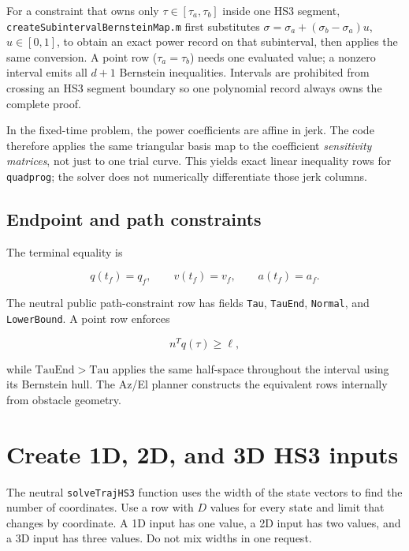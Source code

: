 \documentclass[10pt,letterpaper]{article}
\newcommand{\file}[1]{\nolinkurl{#1}}
\begin{document}
For a constraint that owns only $\tau\in[\tau_a,\tau_b]$ inside one HS3
segment, \file{createSubintervalBernsteinMap.m} first substitutes
$\sigma=\sigma_a+(\sigma_b-\sigma_a)u$, $u\in[0,1]$, to obtain an exact power
record on that subinterval, then applies the same conversion. A point row
($\tau_a=\tau_b$) needs one evaluated value; a nonzero interval emits all
$d+1$ Bernstein inequalities. Intervals are prohibited from crossing an HS3
segment boundary so one polynomial record always owns the complete proof.

In the fixed-time problem, the power coefficients are affine in jerk. The code
therefore applies the same triangular basis map to the coefficient
\emph{sensitivity matrices}, not just to one trial curve. This yields exact
linear inequality rows for \file{quadprog}; the solver does not numerically
differentiate those jerk columns.

\subsection{Endpoint and path constraints}

The terminal equality is

\begin{equation}
q(t_f)=q_f,\qquad v(t_f)=v_f,\qquad a(t_f)=a_f.
\end{equation}

The neutral public path-constraint row has fields
\file{Tau}, \file{TauEnd}, \file{Normal}, and \file{LowerBound}. A point row
enforces

\begin{equation}\label{eq:pathrow}
n^T q(\tau)\ge \ell,
\end{equation}

while $\mathrm{TauEnd}>\mathrm{Tau}$ applies the same half-space throughout the
interval using its Bernstein hull. The Az/El planner constructs the equivalent
rows internally from obstacle geometry.

\section{Create 1D, 2D, and 3D HS3 inputs}\label{sec:dimensionexamples}

The neutral \file{solveTrajHS3} function uses the width of the state vectors to
find the number of coordinates. Use a row with $D$ values for every state and
limit that changes by coordinate. A 1D input has one value, a 2D input has two
values, and a 3D input has three values. Do not mix widths in one request.
\end{document}
